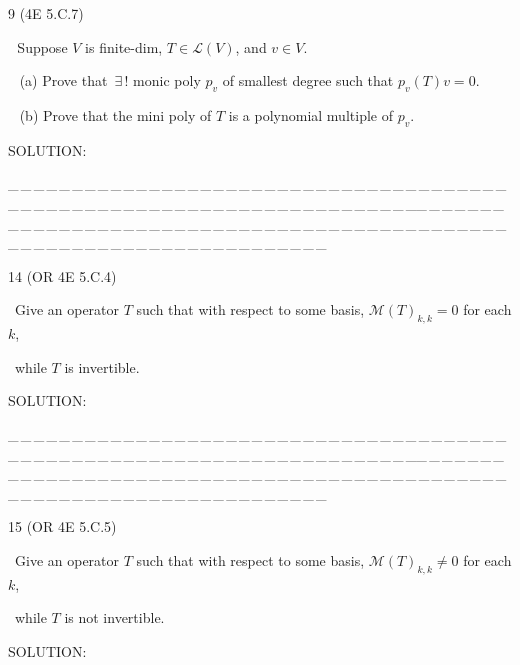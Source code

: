 \documentclass[a4paper, 11pt, UTF8]{article}
\def\Lm{\mathcal{L}}
\def\Mt{\mathcal{M}}
\begin{document}
\begin{large}
{\timesbf\Large 9} (\normalsize{4E 5.C.7})\par\,\, {\timessl\Large 
Suppose $V$ is finite-dim, $T\in \Lm(V)$, and $v \in V$.
}\par\,\,\,
(a) {\timessl\Large
Prove that $\,\exists\,!$ monic poly $p_v$ of smallest degree such that $p_v (T)v = 0$.
}\par\,\,\,
(b) {\timessl\Large
Prove that the mini poly of $T$ is a polynomial multiple of $p_v$.
}\par
{\timesbf S\footnotesize{OLUTION:}}\par\quad

\par
{\tiny \_\,\_\,\_\,\_\,\_\,\_\,\_\,\_\,\_\,\_\,\_\,\_\,\_\,\_\,\_\,\_\,\_\,\_\,\_\,\_\,\_\,\_\,\_\,\_\,\_\,\_\,\_\,\_\,\_\,\_\,\_\,\_\,\_\,\_\,\_\,\_\,\_\,\_\,\_\,\_\,\_\,\_\,\_\,\_\,\_\,\_\,\_\,\_\,\_\,\_\,\_\,\_\,\_\,\_\,\_\,\_\,\_\,\_\,\_\,\_\,\_\,\_\,\_\,\_\,\_\,\_\,\_\,\_\,\_\,\_\,\_\_\,\_\,\_\,\_\,\_\,\_\,\_\,\_\,\_\,\_\,\_\,\_\,\_\,\_\,\_\,\_\,\_\,\_\,\_\,\_\,\_\,\_\,\_\,\_\,\_\,\_\,\_\,\_\,\_\,\_\,\_\,\_\,\_\,\_\,\_\,\_\,\_\,\_\,\_\,\_\,\_\,\_\,\_\,\_\,\_\,\_\,\_\,\_\,\_\,\_\,\_\,\_\,\_\,\_\,\_\,\_\,\_\,\_\,\_\,\_\,\_\,\_\,\_\,\_\,\_\,\_\,\_\,\_\,\_\,\_\,\_}\par


{\timesbf\Large 14} (\normalsize{O{\small R} 4E 5.C.4})\par\quad\, {\timessl\Large 
Give an operator $T$ such that with respect to some basis, $\Mt(T)_{k,k}=0$ for each $k$,}\par\quad\,
{\timessl\Large while $T$ is invertible.
}\par
{\timesbf S\footnotesize{OLUTION:}}\par\quad

\par
{\tiny \_\,\_\,\_\,\_\,\_\,\_\,\_\,\_\,\_\,\_\,\_\,\_\,\_\,\_\,\_\,\_\,\_\,\_\,\_\,\_\,\_\,\_\,\_\,\_\,\_\,\_\,\_\,\_\,\_\,\_\,\_\,\_\,\_\,\_\,\_\,\_\,\_\,\_\,\_\,\_\,\_\,\_\,\_\,\_\,\_\,\_\,\_\,\_\,\_\,\_\,\_\,\_\,\_\,\_\,\_\,\_\,\_\,\_\,\_\,\_\,\_\,\_\,\_\,\_\,\_\,\_\,\_\,\_\,\_\,\_\,\_\_\,\_\,\_\,\_\,\_\,\_\,\_\,\_\,\_\,\_\,\_\,\_\,\_\,\_\,\_\,\_\,\_\,\_\,\_\,\_\,\_\,\_\,\_\,\_\,\_\,\_\,\_\,\_\,\_\,\_\,\_\,\_\,\_\,\_\,\_\,\_\,\_\,\_\,\_\,\_\,\_\,\_\,\_\,\_\,\_\,\_\,\_\,\_\,\_\,\_\,\_\,\_\,\_\,\_\,\_\,\_\,\_\,\_\,\_\,\_\,\_\,\_\,\_\,\_\,\_\,\_\,\_\,\_\,\_\,\_\,\_}\par

{\timesbf\Large 15} (\normalsize{O{\small R} 4E 5.C.5})\par\quad\, {\timessl\Large 
Give an operator $T$ such that with respect to some basis, $\Mt(T)_{k,k}\neq 0$ for each $k$,}\par\quad\,
{\timessl\Large while $T$ is not invertible.
}\par
{\timesbf S\footnotesize{OLUTION:}}\par\quad


\end{large}
\end{document}
